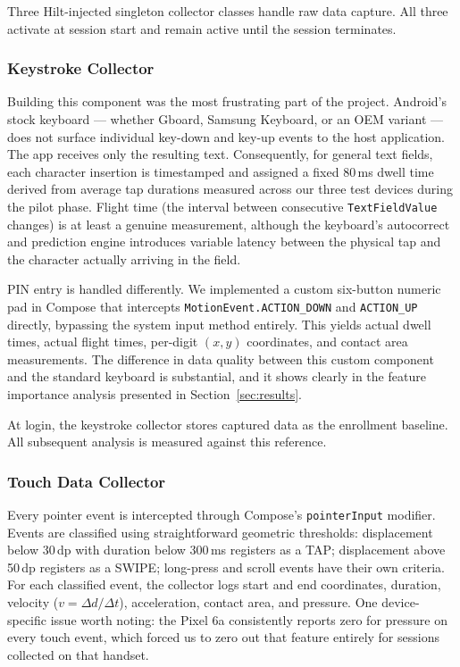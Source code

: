 \documentclass[conference]{IEEEtran}
\begin{document}
Three Hilt-injected singleton collector classes handle raw data capture. All three activate at session start and remain active until the session terminates.

\subsubsection{Keystroke Collector}
Building this component was the most frustrating part of the project. Android's stock keyboard --- whether Gboard, Samsung Keyboard, or an OEM variant --- does not surface individual key-down and key-up events to the host application. The app receives only the resulting text. Consequently, for general text fields, each character insertion is timestamped and assigned a fixed 80\,ms dwell time derived from average tap durations measured across our three test devices during the pilot phase. Flight time (the interval between consecutive \texttt{TextFieldValue} changes) is at least a genuine measurement, although the keyboard's autocorrect and prediction engine introduces variable latency between the physical tap and the character actually arriving in the field.

PIN entry is handled differently. We implemented a custom six-button numeric pad in Compose that intercepts \texttt{MotionEvent.ACTION\_DOWN} and \texttt{ACTION\_UP} directly, bypassing the system input method entirely. This yields actual dwell times, actual flight times, per-digit $(x, y)$ coordinates, and contact area measurements. The difference in data quality between this custom component and the standard keyboard is substantial, and it shows clearly in the feature importance analysis presented in Section~\ref{sec:results}.

At login, the keystroke collector stores captured data as the enrollment baseline. All subsequent analysis is measured against this reference.

\subsubsection{Touch Data Collector}
Every pointer event is intercepted through Compose's \texttt{pointerInput} modifier. Events are classified using straightforward geometric thresholds: displacement below 30\,dp with duration below 300\,ms registers as a TAP; displacement above 50\,dp registers as a SWIPE; long-press and scroll events have their own criteria. For each classified event, the collector logs start and end coordinates, duration, velocity ($v = \Delta d / \Delta t$), acceleration, contact area, and pressure. One device-specific issue worth noting: the Pixel 6a consistently reports zero for pressure on every touch event, which forced us to zero out that feature entirely for sessions collected on that handset.
\end{document}
